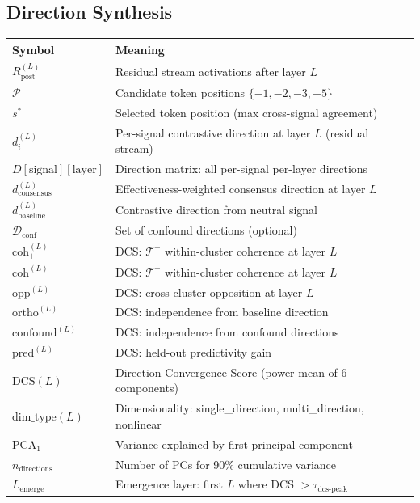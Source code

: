 \documentclass[11pt]{article}
\begin{document}
\subsection{Direction Synthesis}
\label{app:notation-direction-synthesis}

\begin{center}
\begin{tabular}{ll}
\toprule
\textbf{Symbol} & \textbf{Meaning} \\
\midrule
$R^{(L)}_{\text{post}}$ & Residual stream activations after layer $L$ \\
$\mathcal{P}$ & Candidate token positions $\{-1, -2, -3, -5\}$ \\
$s^*$ & Selected token position (max cross-signal agreement) \\
$d^{(L)}_i$ & Per-signal contrastive direction at layer $L$ (residual stream) \\
$D[\text{signal}][\text{layer}]$ & Direction matrix: all per-signal per-layer directions \\
$d^{(L)}_{\text{consensus}}$ & Effectiveness-weighted consensus direction at layer $L$ \\
$d^{(L)}_{\text{baseline}}$ & Contrastive direction from neutral signal \\
$\mathcal{D}_{\text{conf}}$ & Set of confound directions (optional) \\
$\text{coh}^{(L)}_+$ & DCS: $\mathcal{T}^+$ within-cluster coherence at layer $L$ \\
$\text{coh}^{(L)}_-$ & DCS: $\mathcal{T}^-$ within-cluster coherence at layer $L$ \\
$\text{opp}^{(L)}$ & DCS: cross-cluster opposition at layer $L$ \\
$\text{ortho}^{(L)}$ & DCS: independence from baseline direction \\
$\text{confound}^{(L)}$ & DCS: independence from confound directions \\
$\text{pred}^{(L)}$ & DCS: held-out predictivity gain \\
$\text{DCS}(L)$ & Direction Convergence Score (power mean of 6 components) \\
$\text{dim\_type}(L)$ & Dimensionality: single\_direction, multi\_direction, nonlinear \\
$\text{PCA}_1$ & Variance explained by first principal component \\
$n_{\text{directions}}$ & Number of PCs for 90\% cumulative variance \\
$L_{\text{emerge}}$ & Emergence layer: first $L$ where DCS $> \tau_{\text{dcs-peak}}$ \\

\end{tabular}
\end{center}
\end{document}
